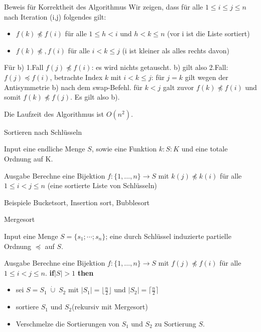 \documentclass{beamer}
\begin{document}
\begin{frame}
\begin{block}{Beweis für Korrektheit des Algorithmus}
Wir zeigen, dass für alle $1 \le i \le j \le n$  nach Iteration (i,j) folgendes gilt:
\begin{itemize}
\item[(a)]$f(k) \not \preceq f(i) $ für alle $1 \le h <i$ und $h<k\le n$ (vor i ist die Liste sortiert)
\item[(b)]$f(k) \not \preceq ,f(i)$ für alle $i<k \le j$ (i ist kleiner als alles rechts davon)
\end{itemize}
Für b)  1.Fall $f(j)\not \preceq f(i)$: es wird nichts getauscht. b) gilt also
	2.Fall:$ f(j) \preceq f(i)$, betrachte Index $k$ mit $i<k \le j$: für $j=k$ gilt wegen der Antisymmetrie b) nach dem swap-Befehl.
für $k<j$ galt zuvor $f(k)\not\preceq f(i)$ und somit $f(k) \not\preceq f(j)$. Es gilt also b).
\end{block}
\begin{block}{Die Laufzeit des Algorithmus ist $O(n^2)$.}
\end{block}
\end{frame}
\begin{frame}{Sortieren nach Schlüsseln}
\begin{block}{Input}
eine endliche Menge $S$, sowie eine Funktion $k: S \colon K$ und eine totale Ordnung auf K.
\end{block}
\begin{block}{Ausgabe}
Berechne eine Bijektion $f \colon \{1,\dots,n\} \to S$ mit $k(j) \not\preceq k(i)$ für alle $1\le i<j \le n$ (eine sortierte Liste von Schlüsseln)
\end{block}
\begin{block}{Beispiele}
Bucketsort, Insertion sort, Bubblesort
\end{block}
\end{frame}
\begin{frame}{Mergesort}
\begin{block}{Input}
eine  Menge $S=\{s_1; \cdots ;s_n \}$; eine durch Schlüssel induzierte partielle Ordnung $\preceq $ auf $S$.
\end{block}
\begin{block}{Ausgabe}
Berechne eine Bijektion $f \colon \{1,\dots,n\} \to S$ mit $f(j) \not\preceq f(i)$ für alle $1\le i<j \le n$.
\textbf{if}{$|S| > 1$}
\textbf{then} \\ \begin{itemize}
    \item  sei $S = S_1 \; \dot{\cup}\;S_2$ mit $|S_1| = \lfloor \frac{n}{2} \rfloor$ und $|S_2| =\lceil \frac{n}{2} \rceil$
\item sortiere $S_1$ und $S_2$(rekursiv mit Mergesort)
\item Verschmelze die Sortierungen von $S_1$ und $S_2$ zu Sortierung $S$.
\end{itemize}
\end{block}
\end{frame}
\end{document}
